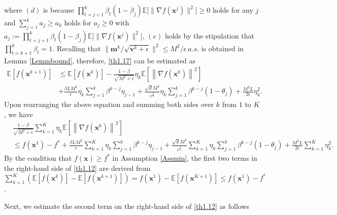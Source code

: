 \documentclass[twoside,11pt]{article}
\begin{document}
where $(d)$ is because $\prod_{t=j+1}^{k}\beta_{t}(1-\beta_{j})\mathbb{E}\big[\| \nabla f(\mathbf{x}^j)\|^2\big]\ge 0$ holds for any $j$ and $\sum_{j=1}^{k}a_j\ge a_k$ holds for $a_j\ge 0$ with $a_j:=\prod_{t=j+1}^{k}\beta_{t}(1-\beta_{j})\mathbb{E}\big[\| \nabla f(\mathbf{x}^j)\|^2\big]$, $(e)$ holds by the stipulation that $\prod_{t=k+1}^{k}\beta_{t}=1$. Recalling
that $\|  {\mathbf{m}^k}/{\sqrt{{\mathbf{v}}^k+\epsilon}}\|^2\le {M^2}/{\epsilon}\ a.s.$ is obtained in Lemma \ref{Lemmbound}, therefore, \eqref{th1.17} can be estimated as
\begin{equation}\label{th1.14}
   	\begin{aligned}
   	\mathbb{E}\left[ f(\mathbf{x}^{k+1})\right] 
   	&\le
   	\mathbb{E}\left[ f(\mathbf{x}^k)\right] 
   	-\frac{1-\beta}{\sqrt{M^2+\epsilon}}\eta_k\mathbb{E}\left[\left\| \nabla f(\mathbf{x}^k)\right\|^2\right]\\
   	&+\frac{\beta L M^2}{\epsilon}\eta_k\sum_{j=1}^{k}\beta^{k-j} \eta_{j-1}
   	+\frac{\sqrt{d} M^4}{\epsilon^{\frac{3}{2}}}\eta_k\sum_{j=1}^{k}\beta^{k-j}(1-\theta_j)
   	+\frac{M^2L}{2\epsilon}\eta_k^2 .
   	\end{aligned}
\end{equation}
Upon rearranging the above equation and summing both sides over $k$ from $1$ to $K$, we have
\begin{equation}\label{th1.12}
   	\begin{aligned}
   	&\frac{1-\beta}{\sqrt{M^2+\epsilon}}\sum_{k=1}^{K}\eta_k\mathbb{E}\left[\left\| \nabla f(\mathbf{x}^k)\right\|^2\right]\\
   	&\le f(\mathbf{x}^1)-f^*
   	+\frac{\beta L M^2}{\epsilon}\sum_{k=1}^{K}\eta_k\sum_{j=1}^{k}\beta^{k-j} \eta_{j-1}
   	+\frac{\sqrt{d} M^4}{\epsilon^{\frac{3}{2}}}\sum_{k=1}^{K}\eta_k\sum_{j=1}^{k}\beta^{k-j}(1-\theta_j)
   	+\frac{M^2L}{2\epsilon}\sum_{k=1}^{K}\eta_k^2.
   	\end{aligned}
\end{equation}
By the condition that $f(\mathbf{x})\geq f^{*}$ in Assumption \ref{Assmin}, the first two terms in the right-hand side of \eqref{th1.12} are derived from $\sum_{k=1}^{K}\left( \mathbb{E}[ f(\mathbf{x}^{k})]-\mathbb{E}[ f(\mathbf{x}^{k+1})]\right) =f(\mathbf{x}^{1})-\mathbb{E}[ f(\mathbf{x}^{K+1})] \le f(\mathbf{x}^{1})-f^*$. 
\par Next, we estimate the second term on the right-hand side of \eqref{th1.12} as follows
\end{document}
